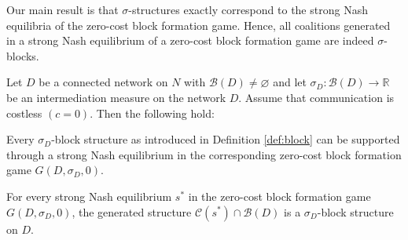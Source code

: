 Our main result is that $\sigma$-structures exactly correspond to the strong Nash equilibria of the zero-cost block formation game. Hence, all coalitions generated in a strong Nash equilibrium of a zero-cost block formation game are indeed $\sigma$-blocks.
\begin{theorem} \label{thm:SNE-block}
Let $D$ be a connected network on $N$ with $\mathcal{B} (D) \neq \varnothing$ and let $\sigma_D \colon \mathcal{B} (D) \to \mathbb{R}$ be an intermediation measure on the network $D$. Assume that communication is costless $(c=0)$. Then the following hold:
\begin{numm}
\item Every $\sigma_D$-block structure as introduced in Definition \ref{def:block} can be supported through a strong Nash equilibrium in the corresponding zero-cost block formation game $G (D, \sigma_D ,0)$.

\item For every strong Nash equilibrium $s^*$ in the zero-cost block formation game $G (D, \sigma_D ,0)$, the generated structure $\mathcal{C} (s^*) \cap \mathcal{B} (D)$ is a $\sigma_D$-block structure on $D$.
\end{numm}
\end{theorem}

